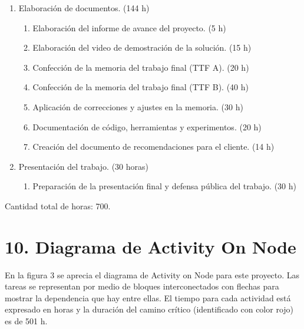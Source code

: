 \documentclass[
11pt, %
]{charter}
\begin{document}
\begin{enumerate}
	\item Elaboración de documentos. (144 h)
	\begin{enumerate}
		\item Elaboración del informe de avance del proyecto. (5 h)
		\item Elaboración del video de demostración de la solución. (15 h)
		\item Confección de la memoria del trabajo final (TTF A). (20 h)
		\item Confección de la memoria del trabajo final (TTF B). (40 h)
		\item Aplicación de correcciones y ajustes en la memoria. (30 h)
		\item Documentación de código, herramientas y experimentos. (20 h)
		\item Creación del documento de recomendaciones para el cliente. (14 h)
	\end{enumerate}
	
	\item Presentación del trabajo. (30 horas)
	\begin{enumerate}
		\item Preparación de la presentación final y defensa pública del trabajo. (30 h)

	\end{enumerate}
	
\end{enumerate}

Cantidad total de horas: 700.


\section{10. Diagrama de Activity On Node}
\label{sec:AoN}
En la figura 3 se aprecia el diagrama de Activity on Node para este proyecto. Las tareas se
representan por medio de bloques interconectados con flechas para mostrar la dependencia que
hay entre ellas. El tiempo para cada actividad está expresado en horas y la duración del camino
crítico (identificado con color rojo) es de 501 h.
\end{document}
